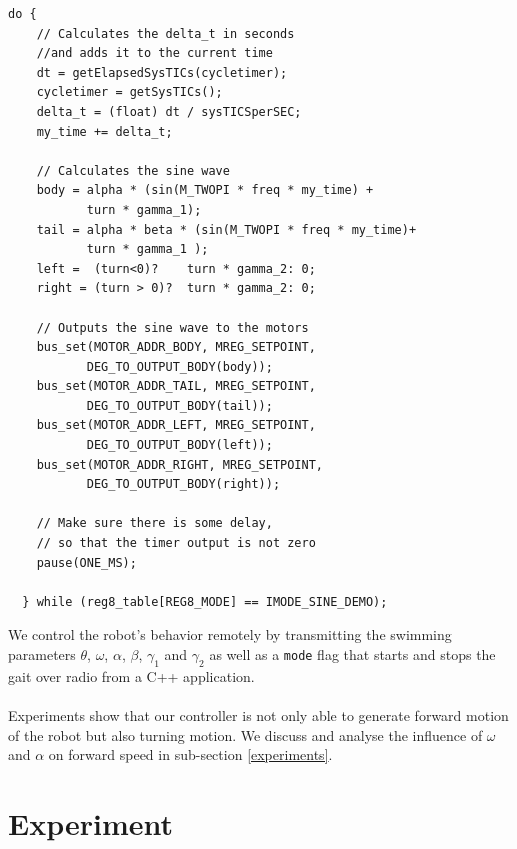 \documentclass[11pt]{article}
\begin{document}
\begin{verbatim}
do {
    // Calculates the delta_t in seconds 
    //and adds it to the current time
    dt = getElapsedSysTICs(cycletimer);
    cycletimer = getSysTICs();
    delta_t = (float) dt / sysTICSperSEC;
    my_time += delta_t;

    // Calculates the sine wave
    body = alpha * (sin(M_TWOPI * freq * my_time) + 
           turn * gamma_1);
    tail = alpha * beta * (sin(M_TWOPI * freq * my_time)+ 
           turn * gamma_1 );
    left =  (turn<0)?    turn * gamma_2: 0;
    right = (turn > 0)?  turn * gamma_2: 0;

    // Outputs the sine wave to the motors
    bus_set(MOTOR_ADDR_BODY, MREG_SETPOINT, 
           DEG_TO_OUTPUT_BODY(body));
    bus_set(MOTOR_ADDR_TAIL, MREG_SETPOINT, 
           DEG_TO_OUTPUT_BODY(tail));
    bus_set(MOTOR_ADDR_LEFT, MREG_SETPOINT, 
           DEG_TO_OUTPUT_BODY(left));
    bus_set(MOTOR_ADDR_RIGHT, MREG_SETPOINT, 
           DEG_TO_OUTPUT_BODY(right));

    // Make sure there is some delay, 
    // so that the timer output is not zero
    pause(ONE_MS);

  } while (reg8_table[REG8_MODE] == IMODE_SINE_DEMO);
\end{verbatim}

We control the robot's behavior remotely by transmitting the swimming parameters $\theta$, $\omega$, $\alpha$, $\beta$, $\gamma_1$ and $\gamma_2$ as well as a \texttt{mode} flag that starts and stops the gait over radio from a C++ application. 
\\ \\
Experiments show that our controller is not only able to generate forward motion of the robot but also turning motion. We discuss and analyse the influence of $\omega$ and $\alpha$ on forward speed in sub-section \ref{experiments}.

\section{Experiment}
\end{document}
